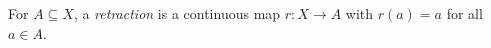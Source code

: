 
For $A\subseteq X$, a \emph{retraction} is a continuous map $r:X\to A$ with $r(a)=a$ for all $a\in A$.
